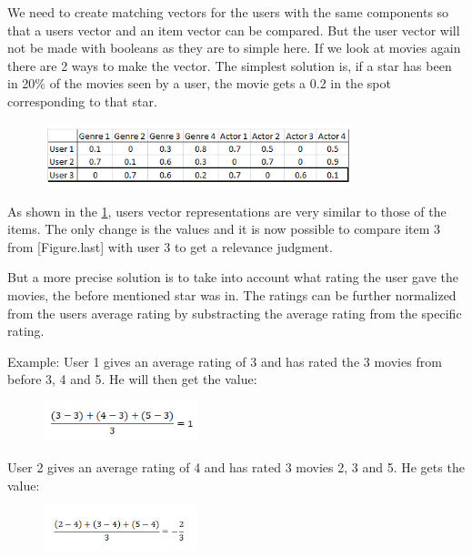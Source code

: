 We need to create matching vectors for the users with the same components so that a users vector and an item vector can be compared. But the user vector will not be made with booleans as they are to simple here. If we look at movies again there are 2 ways to make the vector. The simplest solution is, if a star has been in 20\% of the movies seen by a user, the movie gets a 0.2 in the spot corresponding to that star.

\begin{figure}[H]
\centering
\includegraphics[width=0.8\textwidth]{Images/VectorrepresentationUsers.png}
\caption{}
\label{VrepUser}
\end{figure}

As shown in the \ref{VrepUser}, users vector representations are very similar to those of the items. The only change is the values and it is now possible to compare item 3 from [Figure.last] with user 3 to get a relevance judgment.

But a more precise solution is to take into account what rating the user gave the movies, the before mentioned star was in. The ratings can be further normalized from the users average rating by substracting the average rating from the specific rating.

Example:
User 1 gives an average rating of 3 and has rated the 3 movies from before 3, 4 and 5. He will then get the value:

\begin{figure}[H]
\centering
\includegraphics[width=0.4\textwidth]{Images/Userfeature1.png}
\caption{}
\label{Feature1}
\end{figure}

User 2 gives an average rating of 4 and has rated 3 movies 2, 3 and 5. He gets the value:

\begin{figure}[H]
\centering
\includegraphics[width=0.4\textwidth]{Images/Userfeature2.png}
\caption{}
\label{Feature2}
\end{figure}

